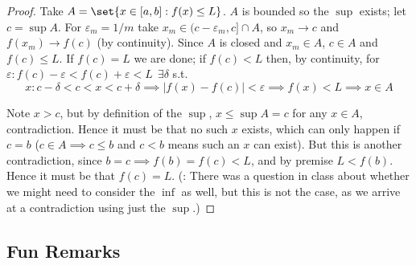 \documentclass{article}
\begin{document}
\begin{proof}
  Take $A = \set{x \in [a, b]: f(x) \le L}$. $A$ is bounded so the $\sup$ exists; let $c = \sup A$. For $\varepsilon_m = 1/m$ take $x_m \in (c - \varepsilon_m, c] \cap A$, so $x_m \to c$ and $f(x_m) \to f(c)$ (by continuity). Since $A$ is closed and $x_m \in A$, $c \in A$ and $f(c) \le L$. If $f(c) = L$ we are done; if $f(c) < L$ then, by continuity, for $\varepsilon: f(c) - \varepsilon < f(c) + \varepsilon < L ~~ \exists \delta$ s.t.
  \[
    x: c - \delta < c < x < c + \delta
    \implies
    |f(x) - f(c)| < \varepsilon
    \implies
    f(x) < L
    \implies
    x \in A
  \]

  Note $x > c$, but by definition of the $\sup$, $x \le \sup A = c$ for any $x \in A$, contradiction. Hence it must be that no such $x$ exists, which can only happen if $c = b$ ($c \in A \implies c \le b$ and $c < b$ means such an $x$ can exist). But this is another contradiction, since $b = c \implies f(b) = f(c) < L$, and by premise $L < f(b)$. Hence it must be that $f(c) = L$. (\NB: There was a question in class about  whether we might need to consider the $\inf$ as well, but this is not the case, as we arrive at a contradiction using just the $\sup$.)
\end{proof}

\subsection{Fun Remarks}
\label{sub:fun_remarks}
\end{document}
